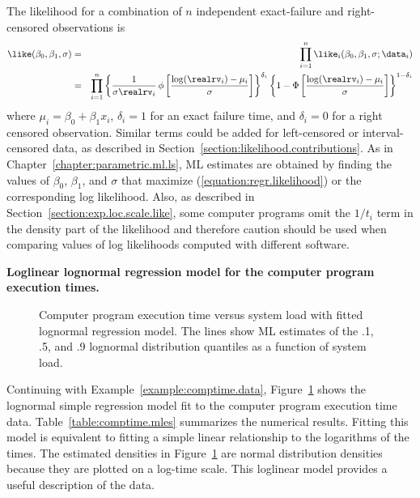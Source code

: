 The likelihood for a combination of $n$ independent exact-failure
and right-censored observations is
\begin{eqnarray}
\label{equation:regr.likelihood}
	\like(\beta_{0},\beta_{1}, \sigma)&=& 	\prod_{i=1}^{n}
\like_{i}(\beta_{0},\beta_{1}, \sigma;\data_{i}) \nonumber \\ 	&=&
\prod_{i=1}^{n} 	\left\{ \frac{1}{\sigma \realrv_{i}} \,
\phi	\left[\frac{ \log(\realrv_{i}) -
\mu_{i}}{\sigma}\right] 	\right\}^{\delta_{i}} 	\left\{1-
\Phi\left[\frac{ \log(\realrv_{i}) 	-\mu_{i} }
{\sigma}\right] \right\}^{1-\delta_{i}}
\end{eqnarray}
where $\mu_{i}=\beta_{0}+\beta_{1} x_{i} $,
$\delta_{i}=1$ for an exact failure time,
and $\delta_{i}=0$ for a right censored observation.
Similar terms could be added
for left-censored or interval-censored data, as described in
Section~\ref{section:likelihood.contributions}. 
As in Chapter~\ref{chapter:parametric.ml.ls}, ML estimates are 
obtained by finding the values of $\beta_{0}$, $\beta_{1}$, 
and $\sigma$ that maximize (\ref{equation:regr.likelihood})
or the corresponding log likelihood. Also, as described in Section~\ref{section:exp.loc.scale.like}, some computer programs omit the $1/t_{i}$ term in the
density part of the likelihood and
therefore caution should be used when comparing values of
log likelihoods computed with different software.

\begin{example}
{\bf Loglinear lognormal regression model for the computer program
execution times.}
\label{example:ct.regr.model}
\begin{figure}
\caption{Computer program execution time versus system load
with fitted lognormal regression model. The lines show ML estimates of
the .1, .5, and .9 lognormal distribution quantiles as a function of
system load.}
\label{figure:comptime.altplot.lnor.ps}
\end{figure}
Continuing with Example~\ref{example:comptime.data},
Figure~\ref{figure:comptime.altplot.lnor.ps} shows the lognormal
simple regression model fit to the computer program execution time
data. Table~\ref{table:comptime.mles} summarizes the numerical
results. Fitting this model is equivalent to fitting a simple linear
relationship to the logarithms of the times.  The estimated densities
in Figure~\ref{figure:comptime.altplot.lnor.ps} are normal
distribution densities because they are plotted on a log-time scale.
This loglinear model provides a useful description of the data.
\end{example}


